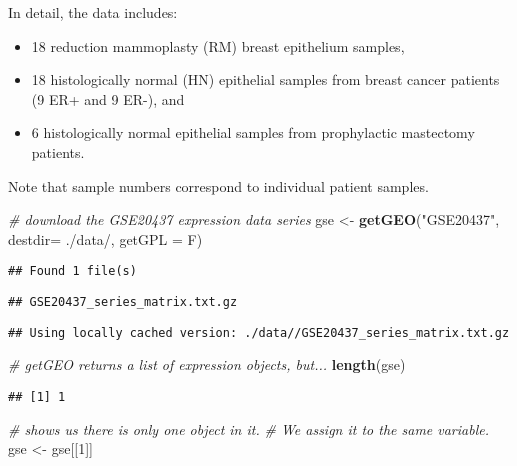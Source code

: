 \documentclass[
]{article}
\newenvironment{Shaded}{\begin{snugshade}}{\end{snugshade}}
\newcommand{\AttributeTok}[1]{\textcolor[rgb]{0.13,0.29,0.53}{#1}}
\newcommand{\CommentTok}[1]{\textcolor[rgb]{0.56,0.35,0.01}{\textit{#1}}}
\newcommand{\DecValTok}[1]{\textcolor[rgb]{0.00,0.00,0.81}{#1}}
\newcommand{\FunctionTok}[1]{\textcolor[rgb]{0.13,0.29,0.53}{\textbf{#1}}}
\newcommand{\NormalTok}[1]{#1}
\newcommand{\OtherTok}[1]{\textcolor[rgb]{0.56,0.35,0.01}{#1}}
\newcommand{\StringTok}[1]{\textcolor[rgb]{0.31,0.60,0.02}{#1}}
\begin{document}
In detail, the data includes:

\begin{itemize}
\item
  18 reduction mammoplasty (RM) breast epithelium samples,
\item
  18 histologically normal (HN) epithelial samples from breast cancer
  patients (9 ER+ and 9 ER-), and
\item
  6 histologically normal epithelial samples from prophylactic
  mastectomy patients.
\end{itemize}

Note that sample numbers correspond to individual patient samples.

\begin{Shaded}
\begin{Highlighting}[]
\CommentTok{\# download the GSE20437 expression data series}
\NormalTok{gse }\OtherTok{\textless{}{-}} \FunctionTok{getGEO}\NormalTok{(}\StringTok{"GSE20437"}\NormalTok{, }\AttributeTok{destdir=} \StringTok{\textquotesingle{}./data/\textquotesingle{}}\NormalTok{, }\AttributeTok{getGPL =}\NormalTok{ F)}
\end{Highlighting}
\end{Shaded}

\begin{verbatim}
## Found 1 file(s)
\end{verbatim}

\begin{verbatim}
## GSE20437_series_matrix.txt.gz
\end{verbatim}

\begin{verbatim}
## Using locally cached version: ./data//GSE20437_series_matrix.txt.gz
\end{verbatim}

\begin{Shaded}
\begin{Highlighting}[]
\CommentTok{\# getGEO returns a list of expression objects, but...}
\FunctionTok{length}\NormalTok{(gse) }
\end{Highlighting}
\end{Shaded}

\begin{verbatim}
## [1] 1
\end{verbatim}

\begin{Shaded}
\begin{Highlighting}[]
\CommentTok{\# shows us there is only one object in it. }
\CommentTok{\# We assign it to the same variable.}
\NormalTok{gse }\OtherTok{\textless{}{-}}\NormalTok{ gse[[}\DecValTok{1}\NormalTok{]]}
\end{Highlighting}
\end{Shaded}
\end{document}
